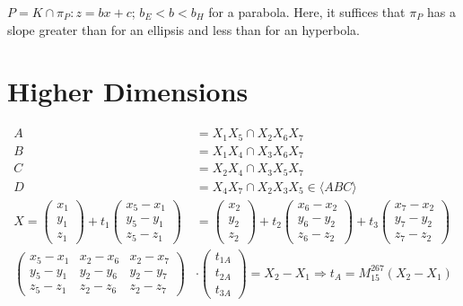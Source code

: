 \documentclass[12pt]{article}
\begin{document}
$P = K\cap \pi_P: z = bx + c$; $b_E < b < b_H$ for a parabola. Here, it suffices that $\pi_P$ has a slope greater than for an ellipsis and less than for an hyperbola.

\section{Higher Dimensions}

\begin{align}
A &= X_1 X_5 \cap X_2 X_6 X_7 \\
B &= X_1 X_4 \cap X_3 X_6 X_7 \\
C &= X_2 X_4 \cap X_3 X_5 X_7 \\
D &= X_4 X_7 \cap X_2 X_3 X_5 \in \langle ABC \rangle \\
X = \begin{pmatrix}
    x_1 \\ y_1 \\ z_1 
\end{pmatrix} + t_1 \begin{pmatrix}
    x_5 - x_1 \\
    y_5 - y_1 \\
    z_5 - z_1 
\end{pmatrix} &= \begin{pmatrix}
    x_2 \\ y_2 \\ z_2
\end{pmatrix} + t_2 \begin{pmatrix}
    x_6 - x_2 \\
    y_6 - y_2 \\
    z_6 - z_2 
\end{pmatrix} + t_3 \begin{pmatrix}
    x_7 - x_2 \\
    y_7 - y_2 \\
    z_7 - z_2
\end{pmatrix} \\
\begin{pmatrix}
    x_5 - x_1 & x_2 - x_6 & x_2 - x_7 \\
    y_5 - y_1 & y_2 - y_6 & y_2 - y_7 \\
    z_5 - z_1 & z_2 - z_6 & z_2 - z_7 
\end{pmatrix} &\cdot \begin{pmatrix}
    t_{1A} \\
    t_{2A} \\
    t_{3A} 
\end{pmatrix} = X_2 - X_1 \Rightarrow t_A = M_{15}^{267} (X_2 - X_1)\\

\end{align}
\end{document}
